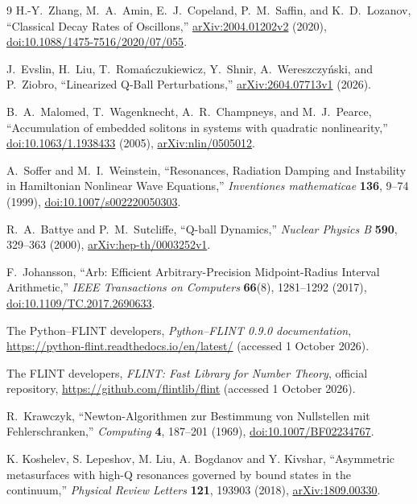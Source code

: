 \begin{thebibliography}{9}
H.-Y.~Zhang, M.~A.~Amin, E.~J.~Copeland, P.~M.~Saffin, and K.~D.~Lozanov,
``Classical Decay Rates of Oscillons,''
\href{https://arxiv.org/abs/2004.01202v2}{arXiv:2004.01202v2} (2020),
\href{https://doi.org/10.1088/1475-7516/2020/07/055}{doi:10.1088/1475-7516/2020/07/055}.

J.~Evslin, H.~Liu, T.~Roma\'nczukiewicz, Y.~Shnir,
A.~Wereszczy\'nski, and P.~Ziobro,
``Linearized Q-Ball Perturbations,''
\href{https://arxiv.org/abs/2604.07713v1}{arXiv:2604.07713v1} (2026).

B.~A.~Malomed, T.~Wagenknecht, A.~R.~Champneys, and M.~J.~Pearce,
``Accumulation of embedded solitons in systems with quadratic nonlinearity,''
\href{https://doi.org/10.1063/1.1938433}{doi:10.1063/1.1938433} (2005),
\href{https://arxiv.org/abs/nlin/0505012}{arXiv:nlin/0505012}.

A.~Soffer and M.~I.~Weinstein,
``Resonances, Radiation Damping and Instability in Hamiltonian Nonlinear Wave Equations,''
\emph{Inventiones mathematicae} \textbf{136}, 9--74 (1999),
\href{https://doi.org/10.1007/s002220050303}{doi:10.1007/s002220050303}.

R.~A.~Battye and P.~M.~Sutcliffe,
``Q-ball Dynamics,'' \emph{Nuclear Physics B} \textbf{590}, 329--363 (2000),
\href{https://arxiv.org/abs/hep-th/0003252v1}{arXiv:hep-th/0003252v1}.

F.~Johansson, ``Arb: Efficient Arbitrary-Precision Midpoint-Radius
Interval Arithmetic,'' \emph{IEEE Transactions on Computers}
\textbf{66}(8), 1281--1292 (2017),
\href{https://doi.org/10.1109/TC.2017.2690633}{doi:10.1109/TC.2017.2690633}.

The Python--FLINT developers, \emph{Python--FLINT 0.9.0 documentation},
\url{https://python-flint.readthedocs.io/en/latest/}
(accessed 1 October 2026).

The FLINT developers, \emph{FLINT: Fast Library for Number Theory},
official repository, \url{https://github.com/flintlib/flint}
(accessed 1 October 2026).

R.~Krawczyk, ``Newton-Algorithmen zur Bestimmung von Nullstellen mit
Fehlerschranken,'' \emph{Computing} \textbf{4}, 187--201 (1969),
\href{https://doi.org/10.1007/BF02234767}{doi:10.1007/BF02234767}.

K. Koshelev, S. Lepeshov, M. Liu, A. Bogdanov and Y. Kivshar,
``Asymmetric metasurfaces with high-Q resonances governed by bound states
in the continuum,'' \emph{Physical Review Letters} \textbf{121}, 193903 (2018),
\href{https://arxiv.org/abs/1809.00330}{arXiv:1809.00330}.


\end{thebibliography}
